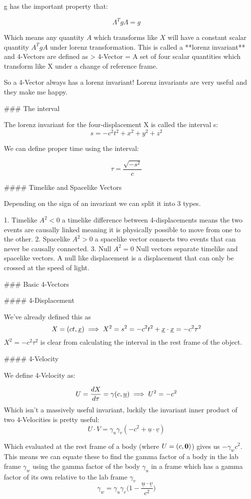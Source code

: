 g has the important property that:

$$
\Lambda^Tg\Lambda = g
$$

Which means any quantity $A$ which transforms like $X$ will have a constant scalar quantity $A^TgA$ under lorenz transformation. This is called a **lorenz invariant** and 4-Vectors are defined as 
> 4-Vector = A set of four scalar quantities which transform like X under a change of reference frame.

So a 4-Vector always has a lorenz invariant! Lorenz invariants are very useful and they make me happy.

### The interval

The lorenz invariant for the four-displacement X is called the interval s:
$$
s = -c^2t^2 + x^2 + y^2 + z^2
$$

We can define proper time using the interval:

$$
\tau = \frac{\sqrt{-s^2}}{c}
$$

#### Timelike and Spacelike Vectors

Depending on the sign of an invariant we can split it into 3 types.

1. Timelike $A^2 < 0$ a timelike difference between 4-displacements means the two events are causally linked meaning it is physically possible to move from one to the other. 
2. Spacelike $A^2 > 0$ a spacelike vector connects two events that can never be causally connected.
3. Null $A^2 = 0$ Null vectors separate timelike and spacelike vectors. A null like displacement is a displacement that can only be crossed at the speed of light.

### Basic 4-Vectors

#### 4-Displacement

We've already defined this as 
$$
X = (ct, \underline{x})\\
\implies X^2 = s^2 = -c^2t^2 + \underline{x}\cdot\underline{x} = -c^2\tau^2
$$
$X^2=-c^2\tau^2$ is clear from calculating the interval in the rest frame of the object.

#### 4-Velocity

We define 4-Velocity as:

$$
U = \frac{dX}{d\tau} = \gamma(c, \underline{u})\\
\implies U^2 = -c^2
$$
Which isn't a massively useful invariant, luckily the invariant inner product of two 4-Velocities is pretty useful:
$$
U\cdot V = \gamma_u\gamma_v(-c^2 + \underline{u}\cdot\underline{v})
$$

Which evaluated at the rest frame of a body (where $U = (c, \bold0)$) gives us $-\gamma_wc^2$. This means we can equate these to find the gamma factor of a body in the lab frame $\gamma_w$ using the gamma factor of the body $\gamma_u$ in a frame which has a gamma factor of its own relative to the lab frame $\gamma_v$
$$
\gamma_w = \gamma_u\gamma_v\bigg(1 - \frac{\underline{u}\cdot\underline{v}}{c^2}\bigg)
$$

